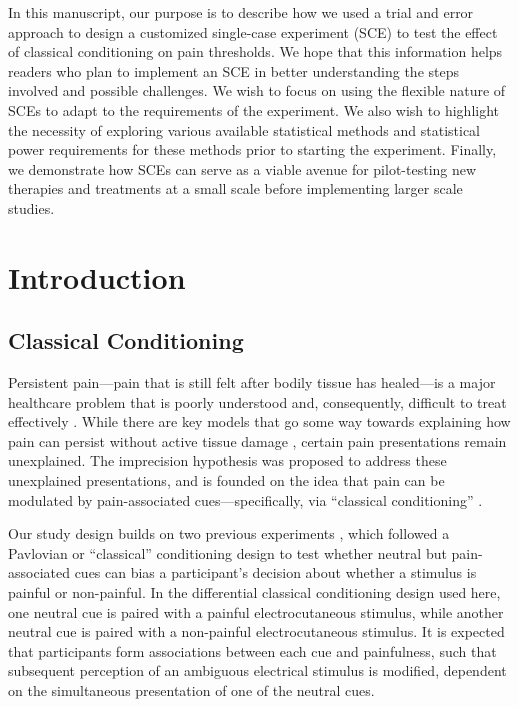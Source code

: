 \documentclass{article}
\begin{document}
In this manuscript, our purpose is to describe how we used a trial and error approach to design a customized single-case experiment (SCE) to test the effect of classical conditioning on pain thresholds. We hope that this information helps readers who plan to implement an SCE in better understanding the steps involved and possible challenges. We wish to focus on using the flexible nature of SCEs to adapt to the requirements of the experiment. We also wish to highlight the necessity of exploring various available statistical methods and statistical power requirements for these methods prior to starting the experiment. Finally, we demonstrate how SCEs can serve as a viable avenue for pilot-testing new therapies and treatments at a small scale before implementing larger scale studies.

\section{Introduction} 

\subsection{Classical Conditioning} 

Persistent pain—pain that is still felt after bodily tissue has healed—is a major healthcare problem that is poorly understood and, consequently, difficult to treat effectively . While there are key models that go some way towards explaining how pain can persist without active tissue damage \autocite{bib1} \autocite{bib2} \autocite{bib3} \autocite{bib4}, certain pain presentations remain unexplained. The imprecision hypothesis was proposed to address these unexplained presentations, and is founded on the idea that pain can be modulated by pain-associated cues—specifically, via “classical conditioning” \autocite{bib5}. 

Our study design builds on two previous experiments \autocite{bib6} \autocite{bib7}, which followed a Pavlovian or “classical” conditioning design \autocite{bib8} to test whether neutral but pain-associated cues can bias a participant's decision about whether a stimulus is painful or non-painful. In the differential classical conditioning design used here, one neutral cue is paired with a painful electrocutaneous stimulus, while another neutral cue is paired with a non-painful electrocutaneous stimulus. It is expected that participants form associations between each cue and painfulness, such that subsequent perception of an ambiguous electrical stimulus is modified, dependent on the simultaneous presentation of one of the neutral cues.
\end{document}
